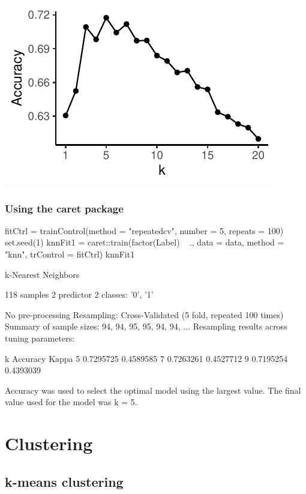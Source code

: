 \documentclass[a4paper]{article}
\begin{document}
\begin{Schunk}
{\centering \includegraphics[width=\maxwidth]{figure/listings-unnamed-chunk-459-2} 

}

\end{Schunk}
\subsubsection{Using the caret package}
\begin{Schunk}
\begin{Sinput}
fitCtrl = trainControl(method = "repeatedcv", number = 5, repeats = 100)
set.seed(1)
knnFit1 = caret::train(factor(Label) ~ ., data = data, method = "knn", 
                       trControl = fitCtrl)
knnFit1
\end{Sinput}
\begin{Soutput}
k-Nearest Neighbors 

118 samples
  2 predictor
  2 classes: '0', '1' 

No pre-processing
Resampling: Cross-Validated (5 fold, repeated 100 times) 
Summary of sample sizes: 94, 94, 95, 95, 94, 94, ... 
Resampling results across tuning parameters:

  k  Accuracy   Kappa    
  5  0.7295725  0.4589585
  7  0.7263261  0.4527712
  9  0.7195254  0.4393039

Accuracy was used to select the optimal model using the largest value.
The final value used for the model was k = 5.
\end{Soutput}
\end{Schunk}
\newpage

\section{Clustering}\label{sec:34}
\subsection{k-means clustering}
\end{document}
